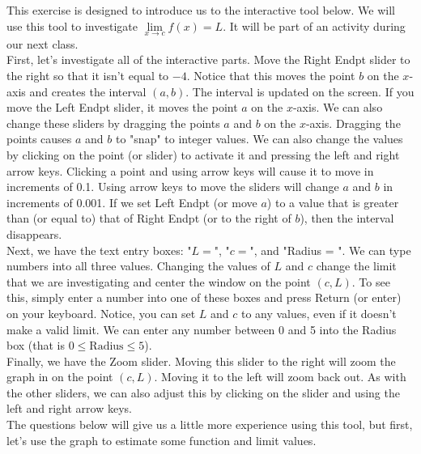 \documentclass{ximera}
\author{Kevin James}
\begin{document}
   \begin{exercise}
   	This exercise is designed to introduce us to the interactive tool below.  We will use this tool to investigate $ \lim\limits_{x \to c}f(x)=L $.  It will be part of an activity during our next class.  \\
   	   	
   	First, let's investigate all of the interactive parts.  Move the Right Endpt slider to the right so that it isn't equal to $-4$.  Notice that this moves the point $b$ on the $x$-axis and creates the interval $(a,b)$. The interval is updated on the screen.  If you move the Left Endpt slider, it moves the point $a$ on the $x$-axis.  We can also change these sliders by dragging the points $a$ and $b$ on the $x$-axis.  Dragging the points causes $a$ and $b$ to "snap" to integer values.  We can also change the values by clicking on the point (or slider) to activate it and pressing the left and right arrow keys.  Clicking a point and using arrow keys will cause it to move in increments of 0.1.  Using arrow keys to move the sliders will change $a$ and $b$ in increments of 0.001. If we set Left Endpt (or move $a$) to a value that is greater than (or equal to) that of Right Endpt (or to the right of $b$), then the interval disappears.\\
   	
   	Next, we have the text entry boxes: "$L = $", "$c=$", and "Radius = ".  We can type numbers into all three values.  Changing the values of $L$ and $c$ change the limit that we are investigating and center the window on the point $ (c,L) $.  To see this, simply enter a number into one of these boxes and press Return (or enter) on your keyboard.  Notice, you can set $L$ and $c$ to any values, even if it doesn't make a valid limit.  We can enter any number between 0 and 5 into the Radius box (that is $ 0 \leq \text{Radius} \leq 5 $). \\
   	
   	Finally, we have the Zoom slider.  Moving this slider to the right will zoom the graph in on the point $ (c, L) $.  Moving it to the left will zoom back out.  As with the other sliders, we can also adjust this by clicking on the slider and using the left and right arrow keys.\\
   	
   	The questions below will give us a little more experience using this tool, but first, let's use the graph to estimate some function and limit values.
   	
   	\begin{center}
   		\begin{onlineOnly}
   		\end{onlineOnly} 
   	\end{center}
   	

\end{exercise}
\end{document}

